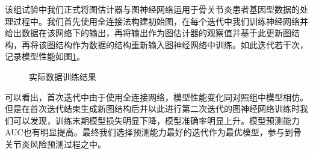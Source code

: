 该组试验中我们正式将图估计器与图神经网络运用于骨关节炎患者基因型数据的处理过程中。我们首先使用全连接法构建初始图，在每个迭代中我们训练神经网络并给出数据在该网络下的输出，再将输出作为图估计器的观察值并基于此更新图结构，再将该图结构作为数据的结构重新输入图神经网络中训练。如此迭代若干次，记录模型性能如图\ref{fig:exp_train}。
\begin{figure}[ht]
\centering
{}
\caption{实际数据训练结果}
\label{fig:exp_train}
\end{figure}

可以看出，首次迭代中由于使用全连接网络，模型性能变化同对照组中模型相仿。但是在首次迭代结束生成新图结构后并以此进行第二次迭代的图神经网络训练时我们可以发现，训练末期模型损失明显下降，模型准确率明显上升。模型预测能力AUC也有明显提高。最终我们选择预测能力最好的迭代作为最优模型，参与到骨关节炎风险预测过程之中。

